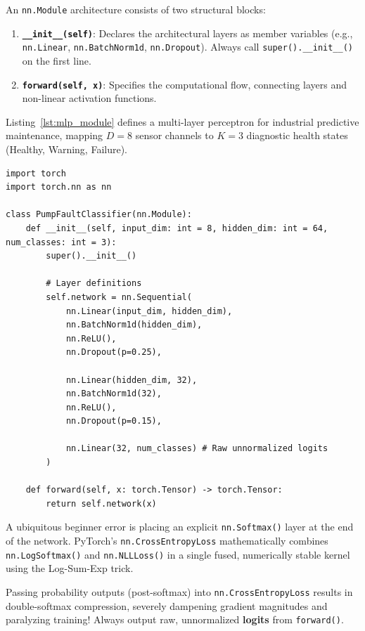 An \texttt{nn.Module} architecture consists of two structural blocks:
\begin{enumerate}
    \item \textbf{\texttt{\_\_init\_\_(self)}}: Declares the architectural layers as member variables (e.g., \texttt{nn.Linear}, \texttt{nn.BatchNorm1d}, \texttt{nn.Dropout}). Always call \texttt{super().\_\_init\_\_()} on the first line.
    \item \textbf{\texttt{forward(self, x)}}: Specifies the computational flow, connecting layers and non-linear activation functions.
\end{enumerate}

Listing~\ref{lst:mlp_module} defines a multi-layer perceptron for industrial predictive maintenance, mapping $D=8$ sensor channels to $K=3$ diagnostic health states (Healthy, Warning, Failure).

\begin{lstlisting}[style=pythonstyle, caption={Multilayer Perceptron architecture using \texttt{torch.nn.Module}.}, label={lst:mlp_module}]
import torch
import torch.nn as nn

class PumpFaultClassifier(nn.Module):
    def __init__(self, input_dim: int = 8, hidden_dim: int = 64, num_classes: int = 3):
        super().__init__()
        
        # Layer definitions
        self.network = nn.Sequential(
            nn.Linear(input_dim, hidden_dim),
            nn.BatchNorm1d(hidden_dim),
            nn.ReLU(),
            nn.Dropout(p=0.25),
            
            nn.Linear(hidden_dim, 32),
            nn.BatchNorm1d(32),
            nn.ReLU(),
            nn.Dropout(p=0.15),
            
            nn.Linear(32, num_classes) # Raw unnormalized logits
        )

    def forward(self, x: torch.Tensor) -> torch.Tensor:
        return self.network(x)
\end{lstlisting}

\begin{warning}
A ubiquitous beginner error is placing an explicit \texttt{nn.Softmax()} layer at the end of the network. PyTorch's \texttt{nn.CrossEntropyLoss} mathematically combines \texttt{nn.LogSoftmax()} and \texttt{nn.NLLLoss()} in a single fused, numerically stable kernel using the Log-Sum-Exp trick.

Passing probability outputs (post-softmax) into \texttt{nn.CrossEntropyLoss} results in double-softmax compression, severely dampening gradient magnitudes and paralyzing training! Always output raw, unnormalized \textbf{logits} from \texttt{forward()}.
\end{warning}

